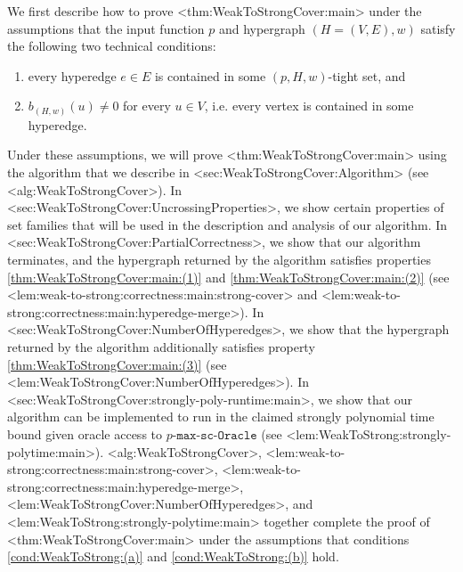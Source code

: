 \documentclass{article}
\def\Cref#1{<#1>}%
\newcommand{\functionMaximizationOracleStrongCover}[1]{\ensuremath{{#1}\text{-}\mathtt{max}\text{-}\mathtt{sc}\text{-}\mathtt{Oracle}}\xspace}
\newcommand{\maximalTightSetContainingHyperedge}[1]{\ensuremath{\tau_{#1}}\xspace}
\begin{document}
We first describe how to prove \Cref{thm:WeakToStrongCover:main} under the assumptions that the input function $p$ and hypergraph $\left(H = (V,E),w\right)$ satisfy the following two technical conditions:
\begin{enumerate}[label=(\alph*), ref=(\alph*)]
    \item \label{cond:WeakToStrong:(a)} %
    every hyperedge $e \in E$ is contained in some $(p, H, w)$-tight set, and
    \item \label{cond:WeakToStrong:(b)} $b_{(H,w)}(u) \not = 0$ for every $u \in V$, i.e. every vertex is contained in some hyperedge.
\end{enumerate}  
Under these assumptions, we will prove \Cref{thm:WeakToStrongCover:main} using the algorithm that we describe in \Cref{sec:WeakToStrongCover:Algorithm} (see \Cref{alg:WeakToStrongCover}). In \Cref{sec:WeakToStrongCover:UncrossingProperties}, we show certain properties of set families that will be used in the description and analysis of our algorithm. In \Cref{sec:WeakToStrongCover:PartialCorrectness}, we show that our algorithm terminates, and the hypergraph returned by the algorithm satisfies properties \ref{thm:WeakToStrongCover:main:(1)} and \ref{thm:WeakToStrongCover:main:(2)} (see \Cref{lem:weak-to-strong:correctness:main:strong-cover} and \Cref{lem:weak-to-strong:correctness:main:hyperedge-merge}). In \Cref{sec:WeakToStrongCover:NumberOfHyperedges}, we show that the hypergraph returned by the algorithm additionally satisfies property \ref{thm:WeakToStrongCover:main:(3)} (see \Cref{lem:WeakToStrongCover:NumberOfHyperedges}). In \Cref{sec:WeakToStrongCover:strongly-poly-runtime:main}, we show that our algorithm can be implemented to run in the claimed strongly polynomial time bound given oracle access to \functionMaximizationOracleStrongCover{p} (see \Cref{lem:WeakToStrong:strongly-polytime:main}).
\Cref{alg:WeakToStrongCover}, \Cref{lem:weak-to-strong:correctness:main:strong-cover}, \Cref{lem:weak-to-strong:correctness:main:hyperedge-merge}, \Cref{lem:WeakToStrongCover:NumberOfHyperedges}, and \Cref{lem:WeakToStrong:strongly-polytime:main} together complete the proof of \Cref{thm:WeakToStrongCover:main} under the assumptions that conditions \ref{cond:WeakToStrong:(a)} and \ref{cond:WeakToStrong:(b)} hold.
\end{document}

